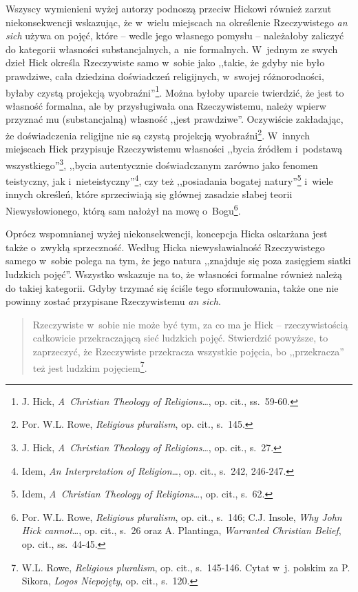 Wszyscy wymienieni wyżej autorzy podnoszą przeciw Hickowi również zarzut niekonsekwencji wskazując, że w~wielu miejscach na określenie Rzeczywistego \textit{an sich} używa on pojęć, które -- wedle jego własnego pomysłu -- należałoby zaliczyć do kategorii własności substancjalnych, a~nie formalnych. W~jednym ze swych dzieł Hick określa Rzeczywiste samo w~sobie jako ,,takie, że gdyby nie było prawdziwe, cała dziedzina doświadczeń religijnych, w~swojej różnorodności, byłaby czystą projekcją wyobraźni''\footnote{J. Hick, \textit{A~Christian Theology of Religions}\ldots, op. cit., ss.~59-60.}. Można byłoby uparcie twierdzić, że jest to własność formalna, ale by przysługiwała ona Rzeczywistemu, należy wpierw przyznać mu (substancjalną) własność ,,jest prawdziwe''. Oczywiście zakładając, że doświadczenia religijne nie są czystą projekcją wyobraźni\footnote{Por. W.L. Rowe, \textit{Religious pluralism}, op. cit., s.~145.}. W~innych miejscach Hick przypisuje Rzeczywistemu własności ,,bycia źródłem i~podstawą wszystkiego''\footnote{J. Hick, \textit{A~Christian Theology of Religions}\ldots, op. cit., s.~27.}, ,,bycia autentycznie doświadczanym zarówno jako fenomen teistyczny, jak i~nieteistyczny''\footnote{Idem, \textit{An Interpretation of Religion}\ldots, op. cit., s.~242, 246-247.}, czy też ,,posiadania bogatej natury''\footnote{Idem, \textit{A~Christian Theology of Religions}\ldots, op. cit., s.~62.} i~wiele innych określeń, które sprzeciwiają się głównej zasadzie słabej teorii Niewysłowionego, którą sam nałożył na mowę o~Bogu\footnote{Por. W.L. Rowe, \textit{Religious pluralism}, op. cit., s.~146; C.J. Insole, \textit{Why John Hick cannot}\ldots, op. cit., s.~26 oraz A. Plantinga, \textit{Warranted Christian Belief}, op. cit., ss.~44-45.}.

Oprócz wspomnianej wyżej niekonsekwencji, koncepcja Hicka oskarżana jest także o~zwykłą sprzeczność. Według Hicka niewysławialność Rzeczywistego samego w~sobie polega na tym, że jego natura ,,znajduje się poza zasięgiem siatki ludzkich pojęć''. Wszystko wskazuje na to, że własności formalne również należą do takiej kategorii. Gdyby trzymać się ściśle tego sformułowania, także one nie powinny zostać przypisane Rzeczywistemu \textit{an sich}.

\begin{quote}
Rzeczywiste w~sobie nie może być tym, za co ma je Hick -- rzeczywistością całkowicie przekraczającą sieć ludzkich pojęć. Stwierdzić powyższe, to zaprzeczyć, że Rzeczywiste przekracza wszystkie pojęcia, bo ,,przekracza'' też jest ludzkim pojęciem\footnote{W.L. Rowe, \textit{Religious pluralism}, op. cit., s.~145-146. Cytat w~j. polskim za P. Sikora, \textit{Logos Niepojęty}, op. cit., s.~120.}.
\end{quote}

